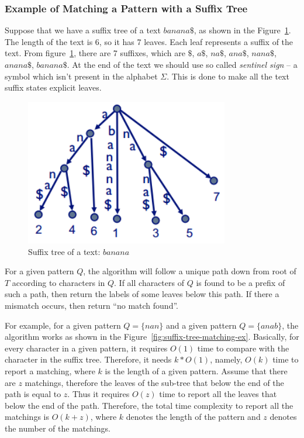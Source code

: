 \documentclass[paper=a4, fontsize=11pt]{scrartcl} %
\numberwithin{equation}{section} %
\numberwithin{figure}{section} %
\numberwithin{table}{section} %
\begin{document}
\subsubsection{Example of Matching a Pattern with a Suffix Tree}
\par Suppose that we have a suffix tree of a text $banana\$$, as shown in the Figure~\ref{fig:suffix-tree-ex}. The length of the text is 6, so it has 7 leaves. Each leaf represents a suffix of the text. From figure~\ref{fig:suffix-tree-ex}, there are 7 suffixes, which are $\$$, $a\$$, $na\$$, $ana\$$, $nana\$$, $anana\$$, $banana\$$. At the end of the text we should use so called \textit{sentinel sign} -- a symbol which isn't present in the alphabet $\Sigma$. This is done to make all the text suffix states explicit leaves.

\begin{figure}
\centering
\includegraphics[width=3.5in]{figures/suffixtree.png}
\caption{Suffix tree of a text: $banana$}
\label{fig:suffix-tree-ex}
\end{figure}

\par For a given pattern $Q$, the algorithm will follow a unique path down from root of $T$ according to characters in $Q$. If all characters of $Q$ is found to be a prefix of such a path, then return the labels of some leaves below this path. If there a mismatch occurs, then return ``no match found''.

\par For example, for a given pattern $Q = \{nan\}$ and a given pattern $Q = \{anab\}$, the algorithm works as shown in the Figure~\ref{fig:suffix-tree-matching-ex}. Basically, for every character in a given pattern, it requires $O(1)$ time to compare with the character in the suffix tree. Therefore, it needs $k*O(1)$, namely, $O(k)$ time to report a matching, where $k$ is the length of a given pattern. Assume that there are $z$ matchings, therefore the leaves of the sub-tree that below the end of the path is equal to $z$. Thus it requires $O(z)$ time to report all the leaves that below the end of the path. Therefore, the total time complexity to report all the matchings is $O(k+z)$, where $k$ denotes the length of the pattern and $z$ denotes the number of the matchings.
\end{document}
